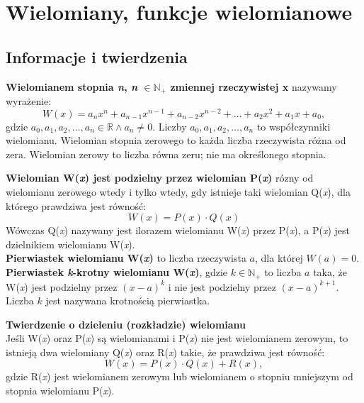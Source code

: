 \documentclass[14pt,a4paper]{extarticle}
\begin{document}
\newpage

\section{Wielomiany, funkcje wielomianowe}
\subsection{Informacje i twierdzenia}
\textbf{Wielomianem stopnia \textit{n}, \textit{n} $\in \mathbb{N}_{+}$ zmiennej rzeczywistej x} nazywamy wyrażenie:
$$W(x) = a_{n}x^{n}+a_{n-1}x^{n-1}+a_{n-2}x^{n-2}+\ldots+a_{2}x^{2}+a_{1}x+a_{0},$$
gdzie $a_{0}, a_{1}, a_{2}, \ldots, a_{n} \in \mathbb{R} \land a_{n} \neq 0$. Liczby $a_{0}, a_{1}, a_{2}, \ldots, a_{n}$ to współczynniki wielomianu.
Wielomian stopnia zerowego to każda liczba rzeczywista różna od zera. Wielomian zerowy to liczba równa zeru; nie ma określonego stopnia.\\
\smallskip

\noindent\textbf{Wielomian W(\textit{x}) jest podzielny przez wielomian P(\textit{x})} rózny od wielomianu zerowego wtedy i tylko wtedy,
gdy istnieje taki wielomian Q(\textit{x}), dla którego prawdziwa jest równość:
$$W(x) = P(x) \cdot Q(x)$$
Wówczas Q(\textit{x}) nazywany jest ilorazem wielomianu W(\textit{x}) przez P(\textit{x}), a P(\textit{x}) 
jest dzielnikiem wielomianu W(\textit{x}).\\

\smallskip
\noindent\textbf{Pierwiastek wielomianu W(\textit{x})} to liczba rzeczywista $a$, dla której $W(a) = 0$.\\

\smallskip
\noindent\textbf{Pierwiastek \textit{k}-krotny wielomianu W(\textit{x})}, gdzie $k \in \mathbb{N}_{+}$ to liczba $a$ taka, że W(\textit{x})
jest podzielny przez $(x-a)^{k}$ i nie jest podzielny przez $(x-a)^{k+1}$. Liczba $k$ jest nazywana krotnością pierwiastka.\\

\bigskip

\noindent\textbf{Twierdzenie o dzieleniu (rozkładzie) wielomianu}\\
Jeśli W(\textit{x}) oraz P(\textit{x}) są wielomianami i P(\textit{x}) nie jest wielomianem zerowym, 
to istnieją dwa wielomiany Q(\textit{x}) oraz R(\textit{x}) takie, że prawdziwa jest równość:
$$W(x) = P(x)\cdot Q(\textit{x})+R(x),$$
gdzie R(\textit{x}) jest wielomianem zerowym lub wielomianem o stopniu mniejszym od stopnia wielomianu P(\textit{x}).\\
\end{document}
